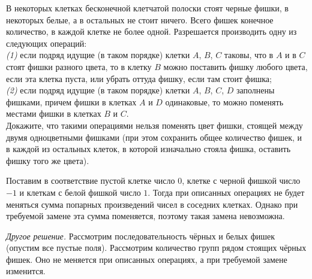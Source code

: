 В некоторых клетках бесконечной клетчатой полоски стоят черные фишки, в
некоторых белые, а в остальных не стоит ничего.
Всего фишек конечное количество, в каждой клетке не более одной.
Разрешается производить одну из следующих операций:
\\\emph{(1)}
если подряд идущие (в таком порядке) клетки $A$, $B$, $C$ таковы, что в $A$ и в
$C$ стоят фишки разного цвета, то в клетку $B$ можно поставить фишку любого
цвета, если эта клетка пуста, или убрать оттуда фишку, если там стоит фишка;
\\\emph{(2)}
если подряд идущие (в таком порядке) клетки $A$, $B$, $C$, $D$ заполнены
фишками, причем фишки в клетках $A$ и $D$ одинаковые, то можно поменять местами
фишки в клетках $B$ и $C$.
\\Докажите, что такими операциями нельзя поменять цвет фишки, стоящей между
двумя одноцветными фишками
(при этом сохранить общее количество фишек, и в каждой из остальных клеток, в
которой изначально стояла фишка, оставить фишку того же цвета).

\solution
Поставим в соответствие пустой клетке число $0$, клетке с черной фишкой число
$-1$ и клеткам с белой фишкой число $1$.
Тогда при описанных операциях не будет меняться сумма попарных произведений
чисел в соседних клетках.
Однако при требуемой замене эта сумма поменяется, поэтому такая замена
невозможна.
\par
\emph{Другое решение.}
Рассмотрим последовательность чёрных и белых фишек (опустим все пустые поля).
Рассмотрим количество групп рядом стоящих чёрных фишек.
Оно не меняется при описанных операциях, а при требуемой замене изменится.

